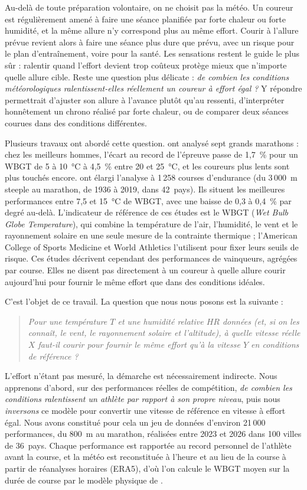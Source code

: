 \documentclass[11pt,a4paper]{article}
\begin{document}
Au-delà de toute préparation volontaire, on ne choisit pas la météo. Un coureur est régulièrement amené à faire une
séance planifiée par forte chaleur ou forte humidité, et la même allure n'y correspond plus au même effort. Courir à
l'allure prévue revient alors à faire une séance plus dure que prévu, avec un risque pour le plan d'entraînement,
voire pour la santé. Les sensations restent le guide le plus sûr : ralentir quand l'effort devient trop coûteux
protège mieux que n'importe quelle allure cible. Reste une question plus délicate : \emph{de combien les conditions
météorologiques ralentissent-elles réellement un coureur à effort égal ?} Y répondre permettrait d'ajuster son allure
à l'avance plutôt qu'au ressenti, d'interpréter honnêtement un chrono réalisé par forte chaleur, ou de comparer deux
séances courues dans des conditions différentes.

Plusieurs travaux ont abordé cette question. \citet{ely2007} ont analysé sept grands marathons : chez les meilleurs
hommes, l'écart au record de l'épreuve passe de 1,7~\% pour un WBGT de 5 à 10~°C à 4,5~\% entre 20 et 25~°C, et les
coureurs plus lents sont plus touchés encore. \citet{mantzios2022} ont élargi l'analyse à 1\,258 courses d'endurance
(du 3\,000~m steeple au marathon, de 1936 à 2019, dans 42~pays). Ils situent les meilleures performances entre 7,5 et
15~°C de WBGT, avec une baisse de 0,3 à 0,4~\% par degré au-delà. L'indicateur de référence de ces études est le WBGT
(\emph{Wet Bulb Globe Temperature}), qui combine la température de l'air, l'humidité, le vent et le rayonnement
solaire en une seule mesure de la contrainte thermique ; l'American College of Sports Medicine et World Athletics
l'utilisent pour fixer leurs seuils de risque. Ces études décrivent cependant des performances de vainqueurs,
agrégées par course. Elles ne disent pas directement à un coureur à quelle allure courir aujourd'hui pour fournir le
même effort que dans des conditions idéales.

C'est l'objet de ce travail. La question que nous nous posons est la suivante :
\begin{quote}
\itshape Pour une température $T$ et une humidité relative $HR$ données (et, si on les connaît, le vent, le
rayonnement solaire et l'altitude), à quelle vitesse réelle $X$ faut-il courir pour fournir le même effort qu'à la
vitesse $Y$ en conditions de référence ?
\end{quote}
L'effort n'étant pas mesuré, la démarche est nécessairement indirecte. Nous apprenons d'abord, sur des performances
réelles de compétition, \emph{de combien les conditions ralentissent un athlète par rapport à son propre niveau},
puis nous \emph{inversons} ce modèle pour convertir une vitesse de référence en vitesse à effort égal. Nous avons
constitué pour cela un jeu de données d'environ 21\,000 performances, du 800~m au marathon, réalisées entre 2023 et
2026 dans 100 villes de 36~pays. Chaque performance est rapportée au record personnel de l'athlète avant la course,
et la météo est reconstituée à l'heure et au lieu de la course à partir de réanalyses horaires (ERA5), d'où l'on
calcule le WBGT moyen sur la durée de course par le modèle physique de \citet{liljegren2008}.
\end{document}
